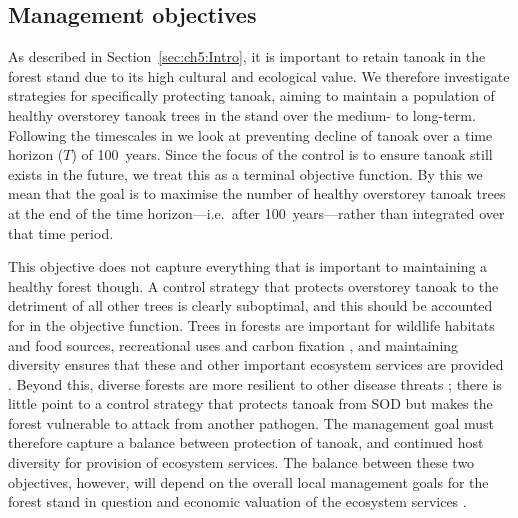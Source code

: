 \newpage
\subsection{Management objectives}\label{sec:ch6:mgmt_objs}

As described in Section~\ref{sec:ch5:Intro}, it is important to retain tanoak in the forest stand due to its high cultural and ecological value. We therefore investigate strategies for specifically protecting tanoak, aiming to maintain a population of healthy overstorey tanoak trees in the stand over the medium- to long-term. Following the timescales in \citet{cobb_ecosystem_2012} we look at preventing decline of tanoak over a time horizon ($T$) of 100~years. Since the focus of the control is to ensure tanoak still exists in the future, we treat this as a terminal objective function. By this we mean that the goal is to maximise the number of healthy overstorey tanoak trees at the end of the time horizon---i.e.\ after 100~years---rather than integrated over that time period.

This objective does not capture everything that is important to maintaining a healthy forest though. A control strategy that protects overstorey tanoak to the detriment of all other trees is clearly suboptimal, and this should be accounted for in the objective function. Trees in forests are important for wildlife habitats and food sources, recreational uses and carbon fixation \citep{swiecki_reference_2013}, and maintaining diversity ensures that these and other important ecosystem services are provided \citep{cadotte_beyond_2011, gamfeldt_higher_2013}. Beyond this, diverse forests are more resilient to other disease threats \citep{keesing_impacts_2010}; there is little point to a control strategy that protects tanoak from SOD but makes the forest vulnerable to attack from another pathogen. The management goal must therefore capture a balance between protection of tanoak, and continued host diversity for provision of ecosystem services. The balance between these two objectives, however, will depend on the overall local management goals for the forest stand in question and economic valuation of the ecosystem services \citep{thompson_forest_2011}.


